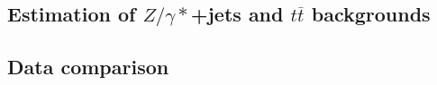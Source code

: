 \subsection{Estimation of \texorpdfstring{$Z/\gamma*$}{Z/y*}+jets and \texorpdfstring{$t\overline{t}$}{tt-bar} backgrounds} \label{sec:ZTTbkg}


\subsection{Data comparison} \label{sec:DataComparison}
